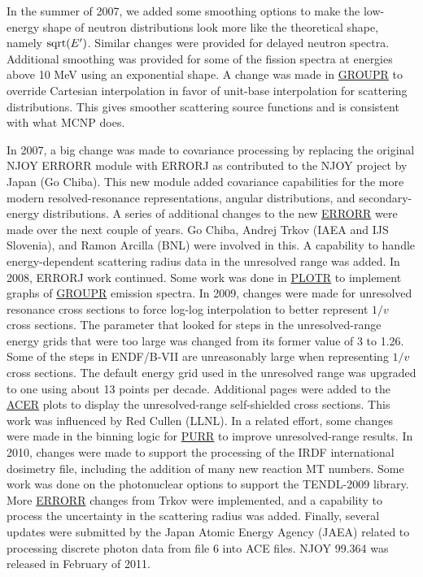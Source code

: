 In the summer of 2007, we added some smoothing options to make
the low-energy shape of neutron distributions look more like
the theoretical shape, namely ${\rm sqrt}(E')$.  Similar changes
were provided for delayed neutron spectra.  Additional smoothing
was provided for some of the fission spectra at energies above
10 MeV using an exponential shape. A change was made in
\hyperlink{sGROUPRhy}{GROUPR} to override
Cartesian interpolation in favor of unit-base interpolation for
scattering distributions.  This gives smoother scattering source
functions and is consistent with what MCNP does.

In 2007, a big change was made to covariance processing by
replacing the original NJOY ERRORR module with
ERRORJ\cite{ERRORJ} as contributed to the NJOY project
by Japan (Go Chiba).  This new module added covariance
capabilities for the more modern resolved-resonance representations,
angular distributions, and secondary-energy distributions.  A series
of additional changes to the new \hyperlink{sERRORRhy}{ERRORR} were
made over the next couple of years.  Go Chiba, Andrej
Trkov (IAEA and IJS Slovenia), and Ramon
Arcilla (BNL) were involved in this.  A capability
to handle energy-dependent scattering radius data in the unresolved
range was added.  In 2008, ERRORJ work continued.
Some work was done in \hyperlink{sPLOTRhy}{PLOTR}
to implement graphs of \hyperlink{sGROUPRhy}{GROUPR}
emission spectra.  In 2009, changes were made
for unresolved resonance cross sections to force log-log interpolation
to better represent $1/v$ cross sections.  The parameter that
looked for steps in the unresolved-range energy grids that were
too large was changed from its former value of 3 to 1.26.  Some
of the steps in ENDF/B-VII are unreasonably large when representing
$1/v$ cross sections.  The default energy grid used in the
unresolved range was upgraded to one using about 13 points per
decade.  Additional pages were added to the \hyperlink{sACERhy}{ACER}
 plots to display the unresolved-range self-shielded
cross sections.  This work was influenced by Red Cullen
(LLNL).  In a related effort, some changes were made in the binning
logic for \hyperlink{sPURRhy}{PURR} to improve
unresolved-range results.  In 2010, changes were made to support
the processing of the IRDF international dosimetry file, including the
addition of many new reaction MT numbers.  Some work was done on the
photonuclear options to support the TENDL-2009 library.  More
\hyperlink{sERRORRhy}{ERRORR} changes from Trkov
were implemented, and a capability to process the uncertainty
in the scattering radius was added.  Finally, several updates were
submitted by the Japan Atomic Energy Agency (JAEA) related to
processing discrete photon data from file 6 into ACE files.  NJOY 99.364
was released in February of 2011.

